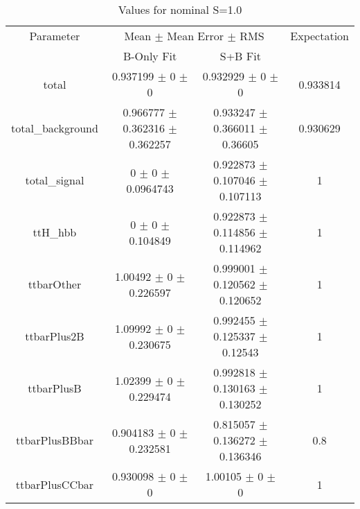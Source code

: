 \begin{table}
\centering
\caption{Values for nominal S=1.0}
\begin{tabular}{cccc}
\toprule
Parameter & \multicolumn{2}{c}{Mean $\pm$ Mean Error $\pm$ RMS} & Expectation\\
 & B-Only Fit & S+B Fit & \\
\midrule
total & \num{0.937199} $\pm$ \num{0} $\pm$ \num{0} & \num{0.932929} $\pm$ \num{0} $\pm$ \num{0} & \num{0.933814}\\
total\_background & \num{0.966777} $\pm$ \num{0.362316} $\pm$ \num{0.362257} & \num{0.933247} $\pm$ \num{0.366011} $\pm$ \num{0.36605} & \num{0.930629}\\
total\_signal & \num{0} $\pm$ \num{0} $\pm$ \num{0.0964743} & \num{0.922873} $\pm$ \num{0.107046} $\pm$ \num{0.107113} & \num{1}\\
ttH\_hbb & \num{0} $\pm$ \num{0} $\pm$ \num{0.104849} & \num{0.922873} $\pm$ \num{0.114856} $\pm$ \num{0.114962} & \num{1}\\
ttbarOther & \num{1.00492} $\pm$ \num{0} $\pm$ \num{0.226597} & \num{0.999001} $\pm$ \num{0.120562} $\pm$ \num{0.120652} & \num{1}\\
ttbarPlus2B & \num{1.09992} $\pm$ \num{0} $\pm$ \num{0.230675} & \num{0.992455} $\pm$ \num{0.125337} $\pm$ \num{0.12543} & \num{1}\\
ttbarPlusB & \num{1.02399} $\pm$ \num{0} $\pm$ \num{0.229474} & \num{0.992818} $\pm$ \num{0.130163} $\pm$ \num{0.130252} & \num{1}\\
ttbarPlusBBbar & \num{0.904183} $\pm$ \num{0} $\pm$ \num{0.232581} & \num{0.815057} $\pm$ \num{0.136272} $\pm$ \num{0.136346} & \num{0.8}\\
ttbarPlusCCbar & \num{0.930098} $\pm$ \num{0} $\pm$ \num{0} & \num{1.00105} $\pm$ \num{0} $\pm$ \num{0} & \num{1}\\
\bottomrule
\end{tabular}
\end{table}